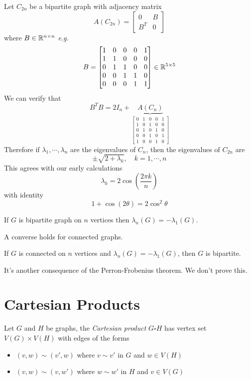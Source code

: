 \begin{example}
Let \(C_{2n}\) be a bipartite graph with adjacency matrix 
\[ A(C_{2n})=\begin{bmatrix}0 & B \\ B^T & 0\end{bmatrix} \]
where \(B\in\mathbb{R}^{n\times n}\) \textit{e.g.}
\[B = \begin{bmatrix}1&0&0&0&1 \\ 1&1&0&0&0 \\ 0&1&1&0&0 \\ 0&0&1&1&0 \\ 0&0&0&1&1 \end{bmatrix}\in\mathbb{R}^{5\times 5} \]
We can verify that
\[ B^T B=2I_n+\underbrace{A(C_n)}_{\begin{bmatrix}0&1&0&0&1 \\ 1&0&1&0&0 \\ 0&1&0&1&0 \\ 0&0&1&0&1 \\ 1&0&0&1&0 \end{bmatrix}} \]
Therefore if \(\lambda_1,\cdots,\lambda_n\) are the eigenvalues of \(C_n\), then the eigenvalues of \(C_{2n}\) are
\[ \pm\sqrt{2+\lambda_k}, \quad k=1,\cdots,n \]
This agrees with our early calculations
\[ \lambda_k=2\cos\left(\frac{2\pi k}{n} \right) \]
with identity
\[ 1+\cos(2\theta)=2\cos^2\theta \]
\end{example}


\begin{corollary}
If \(G\) is bipartite graph on \(n\) vertices then \(\lambda_n(G)=-\lambda_1(G)\).
\end{corollary}
\begin{remark}
A converse holds for connected graphs.
\end{remark}
\begin{proposition}
If \(G\) is connected on \(n\) vertices and \(\lambda_n(G)=-\lambda_1(G)\), then \(G\) is bipartite.
\end{proposition}
\begin{remark}
It's another consequence of the Perron-Frobenius theorem. We don't prove this.
\end{remark}



\section{Cartesian Products}

\begin{definition}
Let \(G\) and \(H\) be graphs, the \emph{Cartesian product} \(G\square H\) has vertex set \(V(G)\times V(H)\) with edges of the forms
\begin{itemize}
\item \((v,w)\sim(v',w)\) where \(v\sim v'\) in \(G\) and \(w\in V(H)\)
\item \((v,w)\sim(v,w')\) where \(w\sim w'\) in \(H\) and \(v\in V(G)\)
\end{itemize}
\end{definition}

